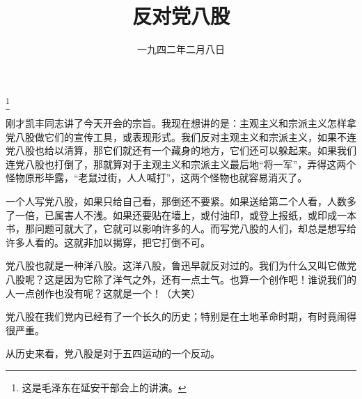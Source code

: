 
\title{反对党八股}
\date{一九四二年二月八日}
\thanks{这是毛泽东在延安干部会上的讲演。}
\maketitle


刚才凯丰同志讲了今天开会的宗旨。我现在想讲的是：主观主义和宗派主义怎样拿党八股做它们的宣传工具，或表现形式。我们反对主观主义和宗派主义，如果不连党八股也给以清算，那它们就还有一个藏身的地方，它们还可以躲起来。如果我们连党八股也打倒了，那就算对于主观主义和宗派主义最后地“将一军”，弄得这两个怪物原形毕露，“老鼠过街，人人喊打”，这两个怪物也就容易消灭了。

一个人写党八股，如果只给自己看，那倒还不要紧。如果送给第二个人看，人数多了一倍，已属害人不浅。如果还要贴在墙上，或付油印，或登上报纸，或印成一本书，那问题可就大了，它就可以影响许多的人。而写党八股的人们，却总是想写给许多人看的。这就非加以揭穿，把它打倒不可。

党八股也就是一种洋八股。这洋八股，鲁迅早就反对过的。我们为什么又叫它做党八股呢？这是因为它除了洋气之外，还有一点土气。也算一个创作吧！谁说我们的人一点创作也没有呢？这就是一个！（大笑）

党八股在我们党内已经有了一个长久的历史；特别是在土地革命时期，有时竟闹得很严重。

从历史来看，党八股是对于五四运动的一个反动。

